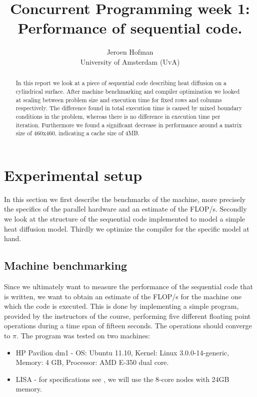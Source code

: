 \documentclass[11pt,a4paper,onecolumn]{article}
\author{Jeroen Hofman  \\
[15pt] University of Amsterdam (\textsc{UvA})}
\title{Concurrent Programming week 1:\\
  Performance of sequential code.
		}
\begin{document}
\maketitle
\captionsetup{width=0.8\textwidth}
\thispagestyle{empty}

\begin{center}
\begin{abstract}
\small{In this report we look at a piece of sequential code describing heat diffusion on a cylindrical surface. After machine benchmarking and compiler optimization we looked at scaling between problem size and execution time for fixed rows and columns respectively. The difference found in total execution time is caused by mixed boundary conditions in the problem, whereas there is no difference in execution time per iteration. Furthermore we found a significant decrease in performance around a matrix size of 460x460, indicating a cache size of 4MB.} \\
\end{abstract}
\end{center}

\newpage
\tableofcontents
\newpage

\section{Experimental setup}
In this section we first describe the benchmarks of the machine, more precisely the specifics of the parallel hardware and an estimate of the FLOP/s. Secondly we look at the structure of the sequential code implemented to model a simple heat diffusion model. Thirdly we optimize the compiler for the specific model at hand.

\subsection{Machine benchmarking}
Since we ultimately want to measure the performance of the sequential code that is written, we want to obtain an estimate of the FLOP/s for the machine one which the code is executed. This is done by implementing a simple program, provided by the instructors of the course, performing five different floating point operations during a time span of fifteen seconds. The operations should converge to $\pi$. The program was tested on two machines:

\begin{itemize}
\item 
  HP Pavilion dm1 - OS: Ubuntu 11.10, Kernel: Linux 3.0.0-14-generic, Memory: 4 GB, Processor: AMD E-350 dual core.
\item
  LISA - for specifications see \cite{LISA}, we will use the 8-core nodes with 24GB memory.
\end{itemize}
\end{document}
